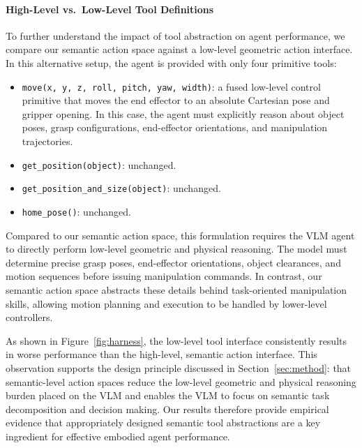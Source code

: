 \documentclass{llmxive}
\begin{document}
\paragraph{High-Level vs.\ Low-Level Tool Definitions}

To further understand the impact of tool abstraction on agent performance, we compare our semantic action space against a low-level geometric action interface. In this alternative setup, the agent is provided with only four primitive tools:

\begin{itemize}
    \item \texttt{move(x, y, z, roll, pitch, yaw, width)}: a fused low-level control primitive that moves the end effector to an absolute Cartesian pose and gripper opening. In this case, the agent must explicitly reason about object poses, grasp configurations, end-effector orientations, and manipulation trajectories.
    
    \item \texttt{get\_position(object)}: unchanged.
    
    \item \texttt{get\_position\_and\_size(object)}: unchanged.
    
    \item \texttt{home\_pose()}: unchanged.
\end{itemize}

Compared to our semantic action space, this formulation requires the VLM agent to directly perform low-level geometric and physical reasoning. The model must determine precise grasp poses, end-effector orientations, object clearances, and motion sequences before issuing manipulation commands. In contrast, our semantic action space abstracts these details behind task-oriented manipulation skills, allowing motion planning and execution to be handled by lower-level controllers.

As shown in Figure~\ref{fig:harness}, the low-level tool interface consistently results in worse performance than the high-level, semantic action interface. This observation supports the design principle discussed in Section~\ref{sec:method}: that semantic-level action spaces reduce the low-level geometric and physical reasoning burden placed on the VLM and enables the VLM to focus on semantic task decomposition and decision making. Our results therefore provide empirical evidence that appropriately designed semantic tool abstractions are a key ingredient for effective embodied agent performance.
\end{document}
